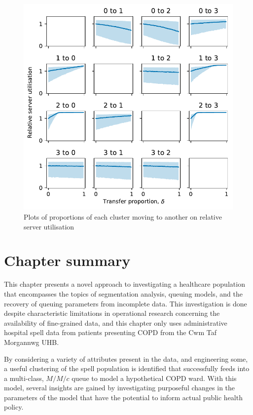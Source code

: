 \begin{figure}
    \centering
    \includegraphics[width=\textwidth]{moving_util}
    \caption{%
        Plots of proportions of each cluster moving to another on relative
        server utilisation
    }\label{fig:moving_util}
\end{figure}

\section{Chapter summary}\label{sec:summary}

This chapter presents a novel approach to investigating a healthcare population
that encompasses the topics of segmentation analysis, queuing models, and the
recovery of queuing parameters from incomplete data. This investigation is done
despite characteristic limitations in operational research concerning the
availability of fine-grained data, and this chapter only uses administrative
hospital spell data from patients presenting COPD from the Cwm Taf Morgannwg
UHB.\

By considering a variety of attributes present in the data, and engineering
some, a useful clustering of the spell population is identified that
successfully feeds into a multi-class, \(M/M/c\) queue to model a hypothetical
COPD ward. With this model, several insights are gained by investigating
purposeful changes in the parameters of the model that have the potential to
inform actual public health policy.

